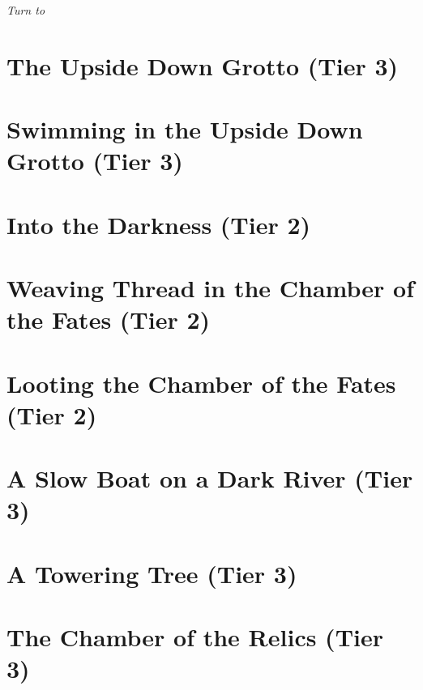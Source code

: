\documentclass[sheet]{GL2020}
\begin{document}
\emph{Turn to \pageref{ObsidianGreenhouse}}

\clearpage

\section*{The Upside Down Grotto (Tier 3)}
\label{UpsideDownGrotto}

\clearpage


\section*{Swimming in the Upside Down Grotto (Tier 3)}
\label{SwiminGrotto}

\clearpage

\section*{Into the Darkness (Tier 2)}
\label{SwiminGrotto}

\clearpage


\section*{Weaving Thread in the Chamber of the Fates (Tier 2)}
\label{WeavingThreadChamberofFates}

\clearpage

\section*{Looting the Chamber of the Fates (Tier 2)}
\label{LootingChamberofFates}

\clearpage

\section*{A Slow Boat on a Dark River (Tier 3)}
\label{SlowBoatDarkRiver}

\clearpage

\section*{A Towering Tree (Tier 3)}
\label{ToweringTree}

\clearpage

\section*{The Chamber of the Relics (Tier 3)}
\label{ChamberofRelics}
\end{document}
